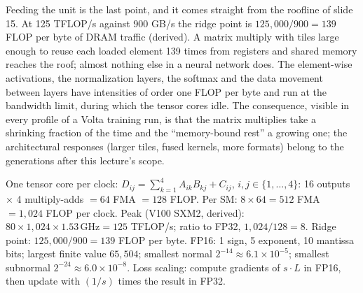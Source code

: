 \documentclass[11pt,letterpaper]{article}
\newenvironment{formulas}{\begin{tcolorbox}[formulabox]}{\end{tcolorbox}}
\begin{document}
Feeding the unit is the last point, and it comes straight from the roofline of slide 15. At 125 TFLOP/s against 900 GB/s the ridge point is $125{,}000/900 = 139$ FLOP per byte of DRAM traffic (derived). A matrix multiply with tiles large enough to reuse each loaded element 139 times from registers and shared memory reaches the roof; almost nothing else in a neural network does. The element-wise activations, the normalization layers, the softmax and the data movement between layers have intensities of order one FLOP per byte and run at the bandwidth limit, during which the tensor cores idle. The consequence, visible in every profile of a Volta training run, is that the matrix multiplies take a shrinking fraction of the time and the ``memory-bound rest'' a growing one; the architectural responses (larger tiles, fused kernels, more formats) belong to the generations after this lecture's scope.

\begin{formulas}
One tensor core per clock: $D_{ij} = \sum_{k=1}^{4} A_{ik}B_{kj} + C_{ij}$, $i,j \in \{1,\dots,4\}$: 16 outputs $\times$ 4 multiply-adds $= 64$ FMA $= 128$ FLOP. Per SM: $8 \times 64 = 512$ FMA $= 1{,}024$ FLOP per clock. Peak (V100 SXM2, derived): $80 \times 1{,}024 \times 1.53\,\text{GHz} = 125$ TFLOP/s; ratio to FP32, $1{,}024 / 128 = 8$. Ridge point: $125{,}000 / 900 = 139$ FLOP per byte. FP16: 1 sign, 5 exponent, 10 mantissa bits; largest finite value $65{,}504$; smallest normal $2^{-14} \approx 6.1\times10^{-5}$; smallest subnormal $2^{-24}\approx 6.0\times10^{-8}$. Loss scaling: compute gradients of $s\cdot L$ in FP16, then update with $(1/s)$ times the result in FP32.
\end{formulas}
\end{document}
